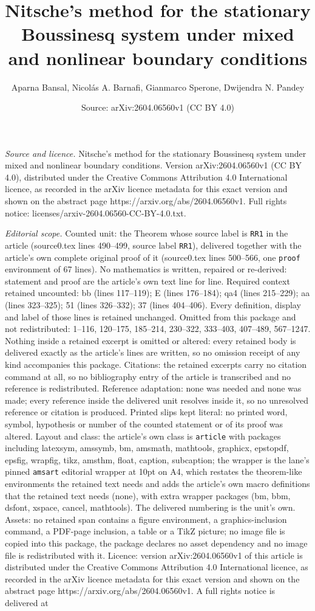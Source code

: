 \documentclass[10pt,a4paper]{amsart}
\title[Nitsche's method for the stationary Boussinesq system under ]{Nitsche's method for the stationary Boussinesq system under mixed and nonlinear boundary conditions}
\author{Aparna Bansal, Nicol\'as A. Barnafi, Gianmarco Sperone, Dwijendra N. Pandey}
\date{Source: arXiv:2604.06560v1 (CC BY 4.0)}
\begin{document}
\maketitle

\noindent\emph{Source and licence.} Nitsche's method for the stationary Boussinesq system under mixed and nonlinear boundary conditions. Version arXiv:2604.06560v1 (CC BY 4.0), distributed under the Creative Commons Attribution 4.0 International licence, as recorded in the arXiv licence metadata for this exact version and shown on the abstract page https://arxiv.org/abs/2604.06560v1. Full rights notice: licenses/arxiv-2604.06560-CC-BY-4.0.txt.\par\smallskip

\noindent\textit{Editorial scope.} Counted unit: the Theorem whose source label is \texttt{RR1} in the article (source0.tex lines 490--499, source label \texttt{RR1}), delivered together with the article's own complete original proof of it (source0.tex lines 500--566, one \texttt{proof} environment of 67 lines). No mathematics is written, repaired or re-derived: statement and proof are the article's own text line for line. Required context retained uncounted: bb (lines 117--119); E (lines 176--184); qa4 (lines 215--229); aa (lines 323--325); 51 (lines 326--332); 37 (lines 404--406). Every definition, display and label of those lines is retained unchanged. Omitted from this package and not redistributed: 1--116, 120--175, 185--214, 230--322, 333--403, 407--489, 567--1247. Nothing inside a retained excerpt is omitted or altered: every retained body is delivered exactly as the article's lines are written, so no omission receipt of any kind accompanies this package. Citations: the retained excerpts carry no citation command at all, so no bibliography entry of the article is transcribed and no reference is redistributed. Reference adaptation: none was needed and none was made; every reference inside the delivered unit resolves inside it, so no unresolved reference or citation is produced. Printed slips kept literal: no printed word, symbol, hypothesis or number of the counted statement or of its proof was altered. Layout and class: the article's own class is \texttt{article} with packages including latexsym, amssymb, bm, amsmath, mathtools, graphicx, epstopdf, epsfig, wrapfig, tikz, amsthm, float, caption, subcaption; the wrapper is the lane's pinned \texttt{amsart} editorial wrapper at 10pt on A4, which restates the theorem-like environments the retained text needs and adds the article's own macro definitions that the retained text needs (none), with extra wrapper packages (bm, bbm, dsfont, xspace, cancel, mathtools). The delivered numbering is the unit's own. Assets: no retained span contains a figure environment, a graphics-inclusion command, a PDF-page inclusion, a table or a TikZ picture; no image file is copied into this package, the package declares no asset dependency and no image file is redistributed with it. Licence: version arXiv:2604.06560v1 of this article is distributed under the Creative Commons Attribution 4.0 International licence, as recorded in the arXiv licence metadata for this exact version and shown on the abstract page https://arxiv.org/abs/2604.06560v1. A full rights notice is delivered at 
\end{document}
